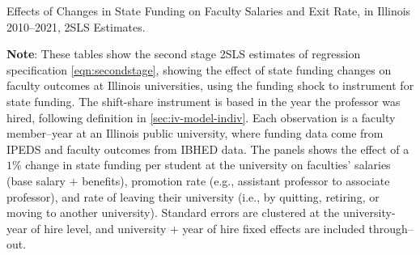 \newpage
\begin{table}[H]
    \singlespacing
    \centering
    \caption{Effects of Changes in State Funding on Faculty Salaries and Exit Rate, in Illinois 2010--2021, 2SLS Estimates.}
    \label{tab:faculty-shock-illinois-rolling}
    \makebox[\textwidth][c]{}
    
    \makebox[\textwidth][c]{}

    \makebox[\textwidth][c]{}

    \justify
    \footnotesize
    \textbf{Note}: 
    These tables show the second stage 2SLS estimates of regression specification \eqref{eqn:secondstage}, showing the effect of state funding changes on faculty outcomes at Illinois universities, using the funding shock to instrument for state funding.
    The shift-share instrument is based in the year the professor was hired, following definition in \autoref{sec:iv-model-indiv}.
    Each observation is a faculty member--year at an Illinois public university, where funding data come from IPEDS and faculty outcomes from IBHED data.
    The panels shows the effect of a $1$\% change in state funding per student at the university on faculties' salaries (base salary $+$ benefits), promotion rate (e.g., assistant professor to associate professor), and rate of leaving their university (i.e., by quitting, retiring, or moving to another university).
    Standard errors are clustered at the university-year of hire level, and university $+$ year of hire fixed effects are included through--out.
\end{table}
